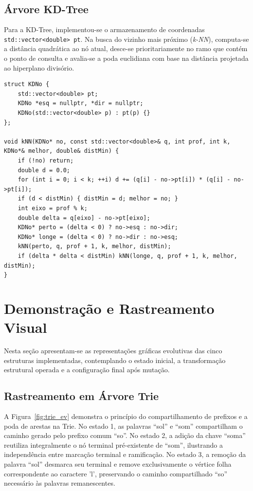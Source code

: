 \documentclass[11pt,a4paper]{article}
\begin{document}
\subsection{Árvore KD-Tree}
Para a KD-Tree, implementou-se o armazenamento de coordenadas \texttt{std::vector<double> pt}. Na busca do vizinho mais próximo (\textit{k-NN}), computa-se a distância quadrática ao nó atual, desce-se prioritariamente no ramo que contém o ponto de consulta e avalia-se a poda euclidiana com base na distância projetada ao hiperplano divisório.

\begin{lstlisting}[caption={Busca de vizinho mais próximo com poda em KD-Tree.},label={alg:kdtree}]
struct KDNo {
    std::vector<double> pt;
    KDNo *esq = nullptr, *dir = nullptr;
    KDNo(std::vector<double> p) : pt(p) {}
};

void kNN(KDNo* no, const std::vector<double>& q, int prof, int k, KDNo*& melhor, double& distMin) {
    if (!no) return;
    double d = 0.0;
    for (int i = 0; i < k; ++i) d += (q[i] - no->pt[i]) * (q[i] - no->pt[i]);
    if (d < distMin) { distMin = d; melhor = no; }
    int eixo = prof % k;
    double delta = q[eixo] - no->pt[eixo];
    KDNo* perto = (delta < 0) ? no->esq : no->dir;
    KDNo* longe = (delta < 0) ? no->dir : no->esq;
    kNN(perto, q, prof + 1, k, melhor, distMin);
    if (delta * delta < distMin) kNN(longe, q, prof + 1, k, melhor, distMin);
}
\end{lstlisting}

\section{Demonstração e Rastreamento Visual}

Nesta seção apresentam-se as representações gráficas evolutivas das cinco estruturas implementadas, contemplando o estado inicial, a transformação estrutural operada e a configuração final após mutação.

\subsection{Rastreamento em Árvore Trie}
A Figura~\ref{fig:trie_ev} demonstra o princípio do compartilhamento de prefixos e a poda de arestas na Trie. No estado 1, as palavras ``sol'' e ``som'' compartilham o caminho gerado pelo prefixo comum ``so''. No estado 2, a adição da chave ``soma'' reutiliza integralmente o nó terminal pré-existente de ``som'', ilustrando a independência entre marcação terminal e ramificação. No estado 3, a remoção da palavra ``sol'' desmarca seu terminal e remove exclusivamente o vértice folha correspondente ao caractere 'l', preservando o caminho compartilhado ``so'' necessário às palavras remanescentes.
\end{document}
